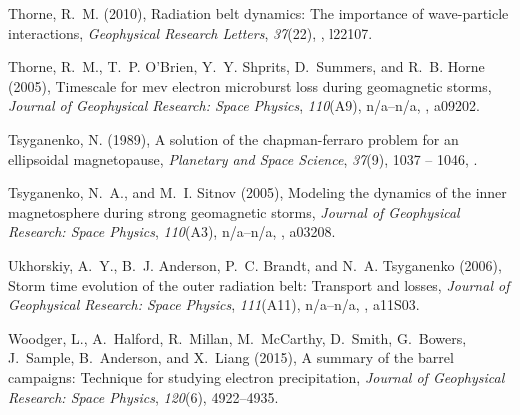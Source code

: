 \documentclass[draft,linenumbers]{agujournal}
\begin{document}
\begin{thebibliography}{35}
Thorne, R.~M. (2010), Radiation belt dynamics: The importance of wave-particle
  interactions, \textit{Geophysical Research Letters}, \textit{37}(22),
  , l22107.

Thorne, R.~M., T.~P. O'Brien, Y.~Y. Shprits, D.~Summers, and R.~B. Horne
  (2005), Timescale for mev electron microburst loss during geomagnetic storms,
  \textit{Journal of Geophysical Research: Space Physics}, \textit{110}(A9),
  n/a--n/a, , a09202.

Tsyganenko, N. (1989), A solution of the chapman-ferraro problem for an
  ellipsoidal magnetopause, \textit{Planetary and Space Science},
  \textit{37}(9), 1037 -- 1046,
  .

Tsyganenko, N.~A., and M.~I. Sitnov (2005), Modeling the dynamics of the inner
  magnetosphere during strong geomagnetic storms, \textit{Journal of
  Geophysical Research: Space Physics}, \textit{110}(A3), n/a--n/a,
  , a03208.

Ukhorskiy, A.~Y., B.~J. Anderson, P.~C. Brandt, and N.~A. Tsyganenko (2006),
  Storm time evolution of the outer radiation belt: Transport and losses,
  \textit{Journal of Geophysical Research: Space Physics}, \textit{111}(A11),
  n/a--n/a, , a11S03.

Woodger, L., A.~Halford, R.~Millan, M.~McCarthy, D.~Smith, G.~Bowers,
  J.~Sample, B.~Anderson, and X.~Liang (2015), A summary of the barrel
  campaigns: Technique for studying electron precipitation, \textit{Journal of
  Geophysical Research: Space Physics}, \textit{120}(6), 4922--4935.

\end{thebibliography}

\end{document}
